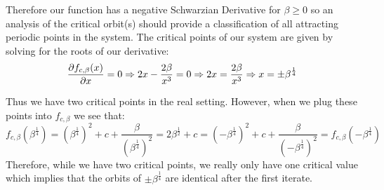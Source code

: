 		Therefore our function has a negative Schwarzian Derivative for $\beta \geq 0$ so an analysis of the critical orbit(s) should provide a classification of all attracting periodic points in the system. The critical points of our system are given by solving for the roots of our derivative:
		\[
			\frac{\partial f_{c, \beta}(x)}{\partial x} = 0  \Rightarrow 2x - \frac{2\beta}{x^3} = 0 \Rightarrow 2x = \frac{2\beta}{x^3} \Rightarrow x = \pm\beta^{\frac{1}{4}}
		\]

		Thus we have two critical points in the real setting. However, when we plug these points into $f_{c, \beta}$ we see that:
		\[
			f_{c, \beta} (\beta^{\frac{1}{4}}) = \left (\beta^{\frac{1}{4}}\right)^2 + c + \frac{\beta}{\left (\beta^{\frac{1}{4}}\right)^2} = 2 \beta^{\frac{1}{2}} + c = \left (-\beta^{\frac{1}{4}}\right)^2 + c + \frac{\beta}{\left (-\beta^{\frac{1}{4}}\right)^2} = f_{c, \beta} (-\beta^{\frac{1}{4}})
		\]
		Therefore, while we have two critical points, we really only have one critical value which implies that the orbits of $\pm \beta^{\frac{1}{4}}$ are identical after the first iterate.

